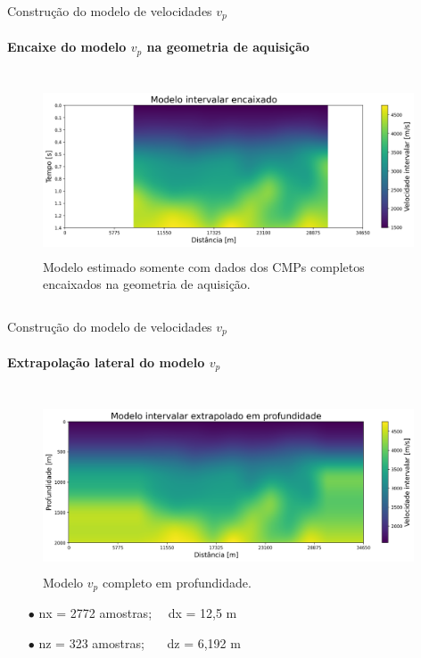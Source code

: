 \documentclass[xcolor=dvipsnames,t]{beamer}
\begin{document}
\begin{frame}{Construção do modelo de velocidades $v_p$}
	\framesubtitle{Encaixe do modelo $v_p$ na geometria de aquisição}	
	
	\begin{columns}[onlytextwidth, T]
		\begin{column}{.9\textwidth}
			\begin{figure}[h]
				\includegraphics[width=11cm,height=5cm]{../imagens/modeloReduzidoINT.png}	
				\tiny{\caption{Modelo estimado somente com dados dos CMPs completos encaixados na geometria de aquisição.}} 	
			\end{figure}			
		\end{column}
	\end{columns}	
	
\end{frame}
\begin{frame}{Construção do modelo de velocidades $v_p$}
	\framesubtitle{Extrapolação lateral do modelo $v_p$}	
	
	\begin{columns}[onlytextwidth, T]
		\begin{column}{.9\textwidth}
			\begin{figure}[h]
				\includegraphics[width=11cm,height=5cm]{../imagens/modeloExtrapoladoINT.png}	
				\tiny{\caption{Modelo $v_p$ completo em profundidade.}} 	 	
			\end{figure}			
			\begin{itemize}
				\small
				\item[$\bullet$] nx = 2772 amostras; $\,\,\,\,$ dx = 12,5 m
				\item[$\bullet$] nz = 323 amostras; $\,\,\,\,\,\,\,$ dz = 6,192 m	
			\end{itemize}
		\end{column}
	\end{columns}	
	
\end{frame}
\end{document}
